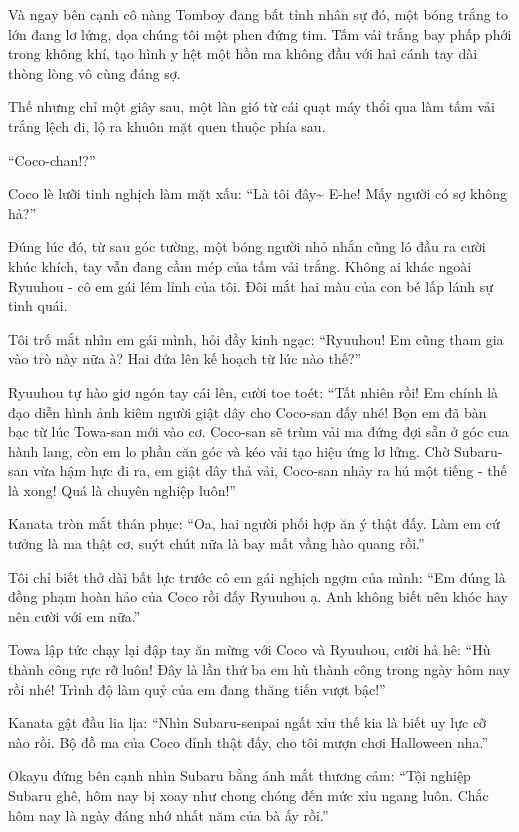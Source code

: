 \documentclass[../main.tex]{subfiles}
\begin{document}
Và ngay bên cạnh cô nàng Tomboy đang bất tỉnh nhân sự đó, một bóng trắng to lớn đang lơ lửng, dọa chúng tôi một phen đứng tim. Tấm vải trắng bay phấp phới trong không khí, tạo hình y hệt một hồn ma không đầu với hai cánh tay dài thòng lòng vô cùng đáng sợ.

Thế nhưng chỉ một giây sau, một làn gió từ cái quạt máy thổi qua làm tấm vải trắng lệch đi, lộ ra khuôn mặt quen thuộc phía sau.

``Coco-chan!?''

Coco lè lưỡi tinh nghịch làm mặt xấu: ``Là tôi đây\~{} E-he! Mấy người có sợ không hả?''

Đúng lúc đó, từ sau góc tường, một bóng người nhỏ nhắn cũng ló đầu ra cười khúc khích, tay vẫn đang cầm mép của tấm vải trắng. Không ai khác ngoài Ryuuhou - cô em gái lém lỉnh của tôi. Đôi mắt hai màu của con bé lấp lánh sự tinh quái.

Tôi trố mắt nhìn em gái mình, hỏi đầy kinh ngạc: ``Ryuuhou! Em cũng tham gia vào trò này nữa à? Hai đứa lên kế hoạch từ lúc nào thế?''

Ryuuhou tự hào giơ ngón tay cái lên, cười toe toét: ``Tất nhiên rồi! Em chính là đạo diễn hình ảnh kiêm người giật dây cho Coco-san đấy nhé! Bọn em đã bàn bạc từ lúc Towa-san mới vào cơ. Coco-san sẽ trùm vải ma đứng đợi sẵn ở góc cua hành lang, còn em lo phần căn góc và kéo vải tạo hiệu ứng lơ lửng. Chờ Subaru-san vừa hậm hực đi ra, em giật dây thả vải, Coco-san nhảy ra hú một tiếng - thế là xong! Quá là chuyên nghiệp luôn!''

Kanata tròn mắt thán phục: ``Oa, hai người phối hợp ăn ý thật đấy. Làm em cứ tưởng là ma thật cơ, suýt chút nữa là bay mất vầng hào quang rồi.''

Tôi chỉ biết thở dài bất lực trước cô em gái nghịch ngợm của mình: ``Em đúng là đồng phạm hoàn hảo của Coco rồi đấy Ryuuhou ạ. Anh không biết nên khóc hay nên cười với em nữa.''

Towa lập tức chạy lại đập tay ăn mừng với Coco và Ryuuhou, cười hả hê: ``Hù thành công rực rỡ luôn! Đây là lần thứ ba em hù thành công trong ngày hôm nay rồi nhé! Trình độ làm quỷ của em đang thăng tiến vượt bậc!''

Kanata gật đầu lia lịa: ``Nhìn Subaru-senpai ngất xỉu thế kia là biết uy lực cỡ nào rồi. Bộ đồ ma của Coco đỉnh thật đấy, cho tôi mượn chơi Halloween nha.''

Okayu đứng bên cạnh nhìn Subaru bằng ánh mắt thương cảm: ``Tội nghiệp Subaru ghê, hôm nay bị xoay như chong chóng đến mức xỉu ngang luôn. Chắc hôm nay là ngày đáng nhớ nhất năm của bà ấy rồi.''
\end{document}
